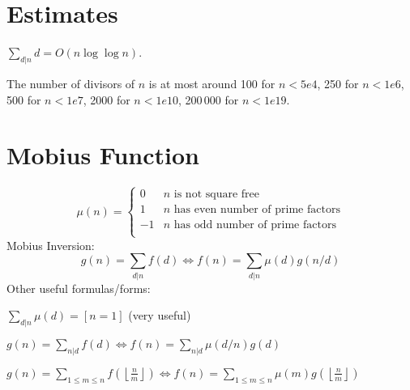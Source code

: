\section{Estimates}
	$\sum_{d|n} d = O(n \log \log n)$.

	The number of divisors of $n$ is at most around 100 for $n < 5e4$, 250 for $n < 1e6$, 500 for $n < 1e7$, 2000 for $n < 1e10$, 200\,000 for $n < 1e19$.

\section{Mobius Function}
	\[
		\mu(n) = \begin{cases} 0 & n \textrm{ is not square free}\\ 1 & n \textrm{ has even number of prime factors}\\ -1 & n \textrm{ has odd number of prime factors}\\\end{cases}
	\]
	Mobius Inversion:
	\[ g(n) = \sum_{d|n} f(d) \Leftrightarrow f(n) = \sum_{d|n} \mu(d)g(n/d) \]
	Other useful formulas/forms:

	$ \sum_{d | n} \mu(d) = [ n = 1] $ (very useful)

	$ g(n) = \sum_{n|d} f(d) \Leftrightarrow f(n) = \sum_{n|d} \mu(d/n)g(d)$

	$ g(n) = \sum_{1 \leq m \leq n} f(\left\lfloor\frac{n}{m}\right \rfloor ) \Leftrightarrow f(n) = \sum_{1\leq m\leq n} \mu(m)g(\left\lfloor\frac{n}{m}\right\rfloor)$ \\
